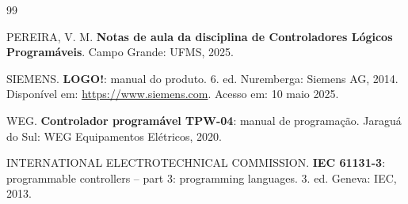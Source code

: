 \documentclass[
  12pt,
  openright,
  oneside,
  a4paper,
  chapter=TITLE,
  section=TITLE,
  brazilian
]{abntex2}
\begin{document}
\postextual

\renewcommand{\bibsection}{%
  \chapter*{REFER\^{E}NCIAS}
  \addcontentsline{toc}{chapter}{REFER\^{E}NCIAS}
}

\begin{thebibliography}{99}

PEREIRA, V. M.
\textbf{Notas de aula da disciplina de Controladores L\'{o}gicos Program\'{a}veis}.
Campo Grande: UFMS, 2025.

SIEMENS.
\textbf{LOGO!}: manual do produto. 6. ed. Nuremberga: Siemens AG, 2014. Dispon\'{i}vel em: \url{https://www.siemens.com}. Acesso em: 10 maio 2025.

WEG.
\textbf{Controlador program\'{a}vel TPW-04}: manual de programa\c{c}\~{a}o. Jaragu\'{a} do Sul: WEG Equipamentos El\'{e}tricos, 2020.

INTERNATIONAL ELECTROTECHNICAL COMMISSION.
\textbf{IEC 61131-3}: programmable controllers -- part 3: programming languages. 3. ed. Geneva: IEC, 2013.

\end{thebibliography}
\end{document}
